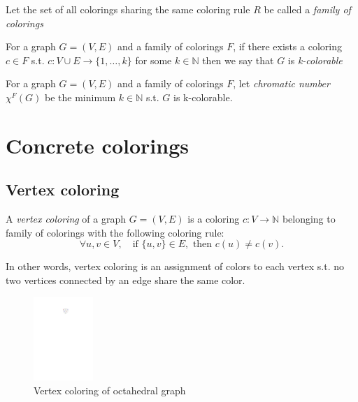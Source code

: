 \begin{definition}
    Let the set of all colorings sharing the same coloring rule $R$ be called a \textit{family of colorings}
\end{definition}

\begin{definition}
    For a graph $G=(V,E)$ and a family of colorings $F$, if there exists a coloring $c \in F$ s.t. $c: V \cup E \rightarrow \{1,\ldots,k\}$ for some $k \in \mathbb{N}$ then we say that $G$ is \textit{k-colorable}
\end{definition}

\begin{definition}
    For a graph $G=(V,E)$ and a family of colorings $F$, let \textit{chromatic number} $\chi ^F (G)$ be the minimum $k \in \mathbb{N}$ s.t. $G$ is k-colorable.
\end{definition}

\section{Concrete colorings}

\subsection{Vertex coloring}

\begin{definition}
    A \textit{vertex coloring} of a graph $G=(V,E)$ is a coloring $c : V \rightarrow \mathbb{N}$ belonging to family of colorings with the following coloring rule:
    \begin{equation}
        \forall u,v \in V, \quad \text{if } \{u,v\} \in E, \text{ then } c(u) \neq c(v). 
        \tag{$R_V$}
    \end{equation}
\end{definition}

In other words, vertex coloring is an assignment of colors to each vertex s.t. no two vertices connected by an edge share the same color.

\begin{figure}[H]
    \centering
    \includegraphics[width=0.2\textwidth]{../Resources/Figs/octahedral_vtx_colr.pdf}
    \caption{Vertex coloring of octahedral graph}
    \label{fig:octahedral_vtx_coloring}
\end{figure}

